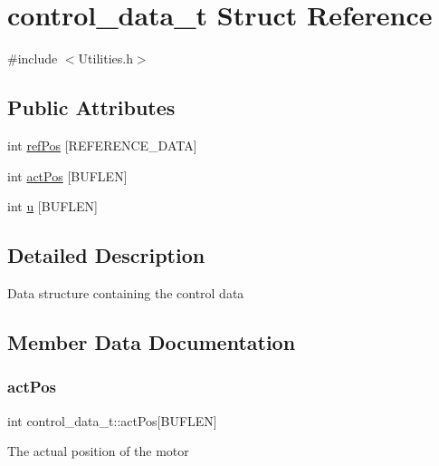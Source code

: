 \hypertarget{structcontrol__data__t}{}\section{control\+\_\+data\+\_\+t Struct Reference}
\label{structcontrol__data__t}


{\ttfamily \#include $<$Utilities.\+h$>$}

\subsection*{Public Attributes}
\begin{DoxyCompactItemize}
\item 
int \mbox{\hyperlink{structcontrol__data__t_a6ad7ecc535cbb0cd2070d49b0791f677}{ref\+Pos}} \mbox{[}R\+E\+F\+E\+R\+E\+N\+C\+E\+\_\+\+D\+A\+TA\mbox{]}
\item 
int \mbox{\hyperlink{structcontrol__data__t_a892c45389a98ba3bfc68972f71eaaf12}{act\+Pos}} \mbox{[}B\+U\+F\+L\+EN\mbox{]}
\item 
int \mbox{\hyperlink{structcontrol__data__t_a36f99e579c05c0ef5c77292d1b0ab65e}{u}} \mbox{[}B\+U\+F\+L\+EN\mbox{]}
\end{DoxyCompactItemize}


\subsection{Detailed Description}
Data structure containing the control data 

\subsection{Member Data Documentation}
\mbox{\label{structcontrol__data__t_a892c45389a98ba3bfc68972f71eaaf12}} 
\subsubsection{\texorpdfstring{act\+Pos}{actPos}}
{\footnotesize\ttfamily int control\+\_\+data\+\_\+t\+::act\+Pos\mbox{[}B\+U\+F\+L\+EN\mbox{]}}

The actual position of the motor \mbox{\label{structcontrol__data__t_a6ad7ecc535cbb0cd2070d49b0791f677}} 
